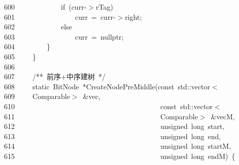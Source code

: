 \documentclass[11pt,a4paper]{ctexart}
\newcommand{\hlstd}[1]{\textcolor[rgb]{0.2,0.2,0.2}{#1}}
\newcommand{\hlcom}[1]{\textcolor[rgb]{0.59,0.59,0.59}{#1}}
\newcommand{\hlopt}[1]{\textcolor[rgb]{0.2,0.2,0.2}{#1}}
\newcommand{\hllin}[1]{\textcolor[rgb]{0.59,0.59,0.59}{#1}}
\newcommand{\hlkwa}[1]{\textcolor[rgb]{0.23,0.42,0.78}{#1}}
\newcommand{\hlkwb}[1]{\textcolor[rgb]{0.63,0,0.31}{#1}}
\newcommand{\hlkwc}[1]{\textcolor[rgb]{0,0.63,0.31}{#1}}
\newcommand{\hlkwd}[1]{\textcolor[rgb]{0.78,0.23,0.41}{#1}}
\begin{document}
\hllin{600\ }\hlstd{}\hlstd{\ \ \ \ \ \ \ \ \ \ \ \ }\hlstd{}\hlkwa{if\ }\hlstd{}\hlopt{(}\hlstd{curr}\hlopt{{-}$>$}\hlstd{rTag}\hlopt{)}\\
\hllin{601\ }\hlstd{}\hlstd{\ \ \ \ \ \ \ \ \ \ \ \ \ \ \ \ }\hlstd{curr\ }\hlopt{=\ }\hlstd{curr}\hlopt{{-}$>$}\hlstd{right}\hlopt{;}\\
\hllin{602\ }\hlstd{}\hlstd{\ \ \ \ \ \ \ \ \ \ \ \ }\hlstd{}\hlkwa{else}\\
\hllin{603\ }\hlstd{}\hlstd{\ \ \ \ \ \ \ \ \ \ \ \ \ \ \ \ }\hlstd{curr\ }\hlopt{=\ }\hlstd{}\hlkwc{nullptr}\hlstd{}\hlopt{;}\\
\hllin{604\ }\hlstd{}\hlstd{\ \ \ \ \ \ \ \ }\hlstd{}\hlopt{\}}\\
\hllin{605\ }\hlstd{}\hlstd{\ \ \ \ }\hlstd{}\hlopt{\}}\\
\hllin{606\ }\hlstd{}\\
\hllin{607\ }\hlstd{}\hlstd{\ \ \ \ }\hlstd{}\hlcom{/{*}{*}\ 前序+中序建树\ {*}/}\hlstd{}\\
\hllin{608\ }\hlstd{}\hlstd{\ \ \ \ }\hlstd{}\hlkwb{static\ }\hlstd{BitNode\ }\hlopt{{*}}\hlstd{}\hlkwd{CreateNodePreMiddle}\hlstd{}\hlopt{(}\hlstd{}\hlkwb{const\ }\hlstd{}\hlkwc{std}\hlstd{}\hlopt{::}\hlstd{vector}\hlopt{$<$}\Righttorque\\
\hllin{609\ }\hlstd{}\hlstd{\ \ \ \ }\hlstd{Comparable}\hlopt{$>$\ \&}\hlstd{vec}\hlopt{,}\\
\hllin{610\ }\hlstd{}\hlstd{\ \ \ \ \ \ \ \ \ \ \ \ \ \ \ \ \ \ \ \ \ \ \ \ \ \ \ \ \ \ \ \ \ \ \ \ \ \ \ \ }\hlstd{}\hlkwb{const\ }\hlstd{}\hlkwc{std}\hlstd{}\hlopt{::}\hlstd{vector}\hlopt{$<$}\Righttorque\\
\hllin{611\ }\hlstd{}\hlstd{\ \ \ \ \ \ \ \ \ \ \ \ \ \ \ \ \ \ \ \ \ \ \ \ \ \ \ \ \ \ \ \ \ \ \ \ \ \ \ \ }\hlstd{Comparable}\hlopt{$>$\ \&}\hlstd{vecM}\hlopt{,}\\
\hllin{612\ }\hlstd{}\hlstd{\ \ \ \ \ \ \ \ \ \ \ \ \ \ \ \ \ \ \ \ \ \ \ \ \ \ \ \ \ \ \ \ \ \ \ \ \ \ \ \ }\hlstd{}\hlkwb{unsigned\ long\ }\hlstd{start}\hlopt{,}\\
\hllin{613\ }\hlstd{}\hlstd{\ \ \ \ \ \ \ \ \ \ \ \ \ \ \ \ \ \ \ \ \ \ \ \ \ \ \ \ \ \ \ \ \ \ \ \ \ \ \ \ }\hlstd{}\hlkwb{unsigned\ long\ }\hlstd{end}\hlopt{,}\\
\hllin{614\ }\hlstd{}\hlstd{\ \ \ \ \ \ \ \ \ \ \ \ \ \ \ \ \ \ \ \ \ \ \ \ \ \ \ \ \ \ \ \ \ \ \ \ \ \ \ \ }\hlstd{}\hlkwb{unsigned\ long\ }\hlstd{startM}\hlopt{,}\\
\hllin{615\ }\hlstd{}\hlstd{\ \ \ \ \ \ \ \ \ \ \ \ \ \ \ \ \ \ \ \ \ \ \ \ \ \ \ \ \ \ \ \ \ \ \ \ \ \ \ \ }\hlstd{}\hlkwb{unsigned\ long\ }\hlstd{endM}\hlopt{)\ \{}\\
\end{document}
